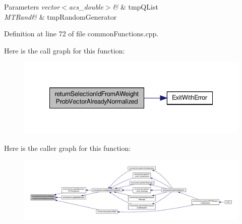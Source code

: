 \begin{DoxyParams}{Parameters}
{\em vector$<$acs\-\_\-double$>$\&} & tmp\-Q\-List \\
\hline
{\em M\-T\-Rand\&} & tmp\-Random\-Generator \\
\hline
\end{DoxyParams}


Definition at line 72 of file common\-Functions.\-cpp.



Here is the call graph for this function\-:\nopagebreak
\begin{figure}[H]
\begin{center}
\leavevmode
\includegraphics[width=338pt]{a00070_a4135ff15fd24eb8fbfee3d00e1cfbf20_cgraph}
\end{center}
\end{figure}




Here is the caller graph for this function\-:\nopagebreak
\begin{figure}[H]
\begin{center}
\leavevmode
\includegraphics[width=350pt]{a00070_a4135ff15fd24eb8fbfee3d00e1cfbf20_icgraph}
\end{center}
\end{figure}


